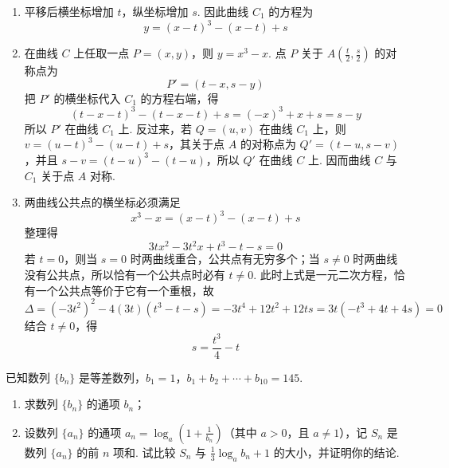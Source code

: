 \begin{solution}
\begin{enumerate}
\item 平移后横坐标增加 \(t\)，纵坐标增加 \(s\). 因此曲线 \(C_{1}\) 的方程为
\[
y=(x-t)^{3}-(x-t)+s
\]

\item 在曲线 \(C\) 上任取一点 \(P=(x,y)\)，则 \(y=x^{3}-x\). 点 \(P\) 关于 \(A\left(\frac{t}{2},\frac{s}{2}\right)\) 的对称点为
\[
P'=(t-x,s-y)
\]
把 \(P'\) 的横坐标代入 \(C_{1}\) 的方程右端，得
\[
(t-x-t)^{3}-(t-x-t)+s=(-x)^{3}+x+s=s-y
\]
所以 \(P'\) 在曲线 \(C_{1}\) 上. 反过来，若 \(Q=(u,v)\) 在曲线 \(C_{1}\) 上，则 \(v=(u-t)^{3}-(u-t)+s\)，其关于点 \(A\) 的对称点为 \(Q'=(t-u,s-v)\)，并且 \(s-v=(t-u)^{3}-(t-u)\)，所以 \(Q'\) 在曲线 \(C\) 上. 因而曲线 \(C\) 与 \(C_{1}\) 关于点 \(A\) 对称.

\item 两曲线公共点的横坐标必须满足
\[
x^{3}-x=(x-t)^{3}-(x-t)+s
\]
整理得
\[
3tx^{2}-3t^{2}x+t^{3}-t-s=0
\]
若 \(t=0\)，则当 \(s=0\) 时两曲线重合，公共点有无穷多个；当 \(s\ne0\) 时两曲线没有公共点，所以恰有一个公共点时必有 \(t\ne0\). 此时上式是一元二次方程，恰有一个公共点等价于它有一个重根，故
\[
\Delta=(-3t^{2})^{2}-4(3t)(t^{3}-t-s)=-3t^{4}+12t^{2}+12ts=3t(-t^{3}+4t+4s)=0
\]
结合 \(t\ne0\)，得
\[
s=\frac{t^{3}}{4}-t
\]
\end{enumerate}
\end{solution}

\begin{problem}
已知数列 \(\{b_{n}\}\) 是等差数列，\(b_{1} = 1\)，\(b_{1} + b_{2} + \cdots + b_{10} = 145\).

\begin{enumerate}
\item 求数列 \(\{b_{n}\}\) 的通项 \(b_n\)；
\item 设数列 \(\{a_{n}\}\) 的通项 \(a_n = \log_a \left(1 + \frac{1}{b_n}\right)\)（其中 \(a > 0\)，且 \(a \neq 1\)），记 \(S_n\) 是数列 \(\{a_{n}\}\) 的前 \(n\) 项和. 试比较 \(S_n\) 与 \(\frac{1}{3}\log_a b_n + 1\) 的大小，并证明你的结论.
\end{enumerate}
\end{problem}

